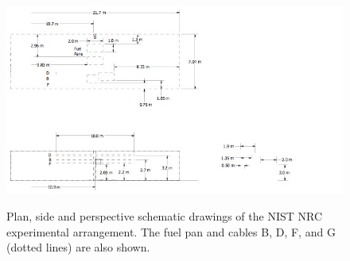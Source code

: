 \begin{figure}[\figoptions{t}]
\begin{center}
\includegraphics[width=8.0in, angle=90]{FIGURES/NIST_NRC/NISTNRC_Detailed}\\
\end{center}
\caption{Plan, side and perspective schematic drawings of the NIST NRC experimental arrangement. The fuel pan and cables B, D, F, and G (dotted lines) are also shown.}
 \label{fig:NISTNRC_Detailed}
\end{figure}

